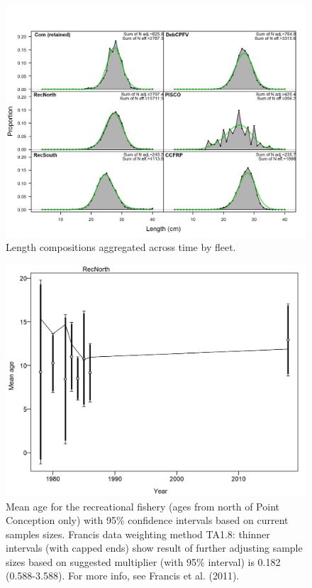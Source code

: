 \documentclass[12pt,]{article}
\begin{document}
\FloatBarrier 

\begin{figure}
\centering
\includegraphics{r4ss/plots_mod1/comp_lenfit__aggregated_across_time.png}
\caption{Length compositions aggregated across time by fleet.
\label{fig:comp_lenfit__aggregated_across_time}}
\end{figure}

\FloatBarrier

\begin{figure}
\centering
\includegraphics{r4ss/plots_mod1/comp_condAALfit_data_weighting_TA1.8_condAgeRecNorth.png}
\caption{Mean age for the recreational fishery (ages from north of Point
Conception only) with 95\% confidence intervals based on current samples
sizes. Francis data weighting method TA1.8: thinner intervals (with
capped ends) show result of further adjusting sample sizes based on
suggested multiplier (with 95\% interval) is 0.182 (0.588-3.588). For
more info, see Francis et al. (2011).
\label{fig:comp_condAALfit_data_weighting_TA1.8_condAgeRecNorth}}
\end{figure}
\end{document}
